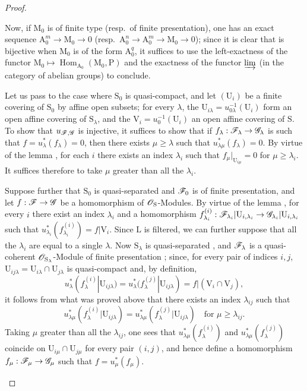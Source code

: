 \begin{proof}
\begin{enumerate}[label=(\roman*)]
Now, if $\mathrm{M}_0$ is of finite type (resp.\ of finite presentation), one has an exact sequence $\mathrm{A}_0^m\to\mathrm{M}_0\to 0$ (resp.\ $\mathrm{A}_0^n\to\mathrm{A}_0^m\to\mathrm{M}_0\to 0$); since it is clear that  is bijective when $\mathrm{M}_0$ is of the form $\mathrm{A}_0^q$, it suffices to use the left-exactness of the functor $\mathrm{M}_0\mapsto\operatorname{Hom}_{\mathrm{A}_0}(\mathrm{M}_0,\mathrm{P})$ and the exactness of the functor $\varinjlim$ (in the category of abelian groups) to conclude.

\medskip
Let us pass to the case where $\mathrm{S}_0$ is quasi-compact, and let $(\mathrm{U}_i)$ be a finite covering of $\mathrm{S}_0$ by affine open subsets; for every $\lambda$, the $\mathrm{U}_{i\lambda}=u_{0\lambda}^{-1}(\mathrm{U}_i)$ form an open affine covering of $\mathrm{S}_\lambda$, and the $\mathrm{V}_i=u_0^{-1}(\mathrm{U}_i)$ an open affine covering of $\mathrm{S}$.
To show that $u_{\mathscr{F},\mathscr{G}}$ is injective, it suffices to show that if $f_\lambda:\mathscr{F}_\lambda\to\mathscr{G}_\lambda$ is such that $f=u_\lambda^*(f_\lambda)=0$, then there exists $\mu\geqslant\lambda$ such that $u_{\lambda\mu}^*(f_\lambda)=0$.
By virtue of the lemma , for each $i$ there exists an index $\lambda_i$ such that $f_\mu|_{\mathrm{U}_{i\mu}}=0$ for $\mu\geqslant\lambda_i$.
It suffices therefore to take $\mu$ greater than all the $\lambda_i$.

Suppose further that $\mathrm{S}_0$ is quasi-separated and $\mathscr{F}_0$ is of finite presentation, and let $f:\mathscr{F}\to\mathscr{G}$ be a homomorphism of $\mathscr{O}_\mathrm{S}$-Modules.
By virtue of the lemma , for every $i$ there exist an index $\lambda_i$ and a homomorphism $f_{\lambda_i}^{(i)}:\mathscr{F}_{\lambda_i}|\mathrm{U}_{i,\lambda_i}\to\mathscr{G}_{\lambda_i}|\mathrm{U}_{i,\lambda_i}$ such that $u_{\lambda_i}^*(f_{\lambda_i}^{(i)})=f|\mathrm{V}_i$.
Since $\mathrm{L}$ is filtered, we can further suppose that all the $\lambda_i$ are equal to a single $\lambda$.
Now $\mathrm{S}_\lambda$ is quasi-separated , and $\mathscr{F}_\lambda$ is a quasi-coherent $\mathscr{O}_{\mathrm{S}_\lambda}$-Module of finite presentation ; since, for every pair of indices $i,j$, $\mathrm{U}_{ij\lambda}=\mathrm{U}_{i\lambda}\cap\mathrm{U}_{j\lambda}$ is quasi-compact and, by definition,
\[
  u_\lambda^*(f_\lambda^{(i)}|\mathrm{U}_{ij\lambda})=u_\lambda^*(f_\lambda^{(j)}|\mathrm{U}_{ij\lambda})=f|(\mathrm{V}_i\cap\mathrm{V}_j),
\]
it follows from what was proved above that there exists an index $\lambda_{ij}$ such that
\[
  u_{\lambda\mu}^*(f_\lambda^{(i)}|\mathrm{U}_{ij\lambda})=u_{\lambda\mu}^*(f_\lambda^{(j)}|\mathrm{U}_{ij\lambda})\quad\text{for }\mu\geqslant\lambda_{ij}.
\]
Taking $\mu$ greater than all the $\lambda_{ij}$, one sees that $u_{\lambda\mu}^*(f_\lambda^{(i)})$ and $u_{\lambda\mu}^*(f_\lambda^{(j)})$ coincide on $\mathrm{U}_{i\mu}\cap\mathrm{U}_{j\mu}$ for every pair $(i,j)$, and hence define a homomorphism $f_\mu:\mathscr{F}_\mu\to\mathscr{G}_\mu$ such that $f=u_\mu^*(f_\mu)$.

\end{enumerate}
\end{proof}

